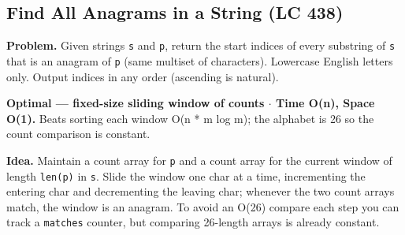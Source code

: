 \documentclass[11pt]{article}
\begin{document}
\subsection{Find All Anagrams in a String (LC 438)}\label{find-all-anagrams-in-a-string-lc-438}

\textbf{Problem.} Given strings \texttt{s} and \texttt{p}, return the start indices of every substring of \texttt{s} that is an anagram of \texttt{p} (same multiset of characters). Lowercase English letters only. Output indices in any order (ascending is natural).

\textbf{Optimal --- fixed-size sliding window of counts \(\cdot\) Time O(n), Space O(1).} Beats sorting each window O(n * m log m); the alphabet is 26 so the count comparison is constant.

\textbf{Idea.} Maintain a count array for \texttt{p} and a count array for the current window of length \texttt{len(p)} in \texttt{s}. Slide the window one char at a time, incrementing the entering char and decrementing the leaving char; whenever the two count arrays match, the window is an anagram. To avoid an O(26) compare each step you can track a \texttt{matches} counter, but comparing 26-length arrays is already constant.

\end{document}
